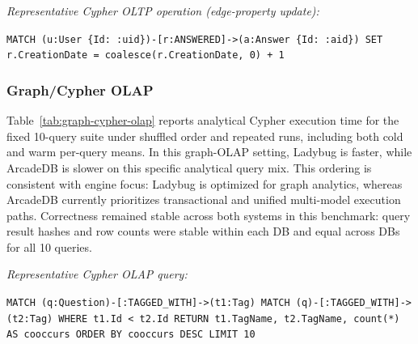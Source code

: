 \documentclass[sigconf, nonacm]{acmart}
\begin{document}
\par\smallskip\noindent\hspace*{1em}\textit{Representative Cypher OLTP operation (edge-property update):}
\begin{flushleft}
\small
\texttt{MATCH (u:User \{Id: :uid\})-[r:ANSWERED]->(a:Answer \{Id: :aid\})}\
\texttt{SET r.CreationDate = coalesce(r.CreationDate, 0) + 1}
\end{flushleft}

\subsubsection{Graph/Cypher OLAP}

\begin{table}[tb]
  \centering
  \caption{Graph/Cypher OLAP execution (Stack Overflow dataset, mean over 3 runs, 10-query suite with 10 shuffled runs).}
  \label{tab:graph-cypher-olap}
  \small
\end{table}

Table~\ref{tab:graph-cypher-olap} reports analytical Cypher execution time for the fixed 10-query suite under shuffled order and repeated runs, including both cold and warm per-query means. In this graph-OLAP setting, Ladybug is faster, while ArcadeDB is slower on this specific analytical query mix. This ordering is consistent with engine focus: Ladybug is optimized for graph analytics, whereas ArcadeDB currently prioritizes transactional and unified multi-model execution paths. Correctness remained stable across both systems in this benchmark: query result hashes and row counts were stable within each DB and equal across DBs for all 10 queries.

\par\smallskip\noindent\hspace*{1em}\textit{Representative Cypher OLAP query:}
\begin{flushleft}
\small
\texttt{MATCH (q:Question)-[:TAGGED\_WITH]->(t1:Tag)}\
\texttt{MATCH (q)-[:TAGGED\_WITH]->(t2:Tag)}\
\texttt{WHERE t1.Id < t2.Id}\
\texttt{RETURN t1.TagName, t2.TagName, count(*) AS cooccurs}\
\texttt{ORDER BY cooccurs DESC LIMIT 10}
\end{flushleft}
\end{document}
